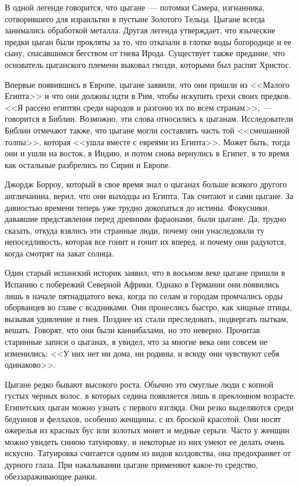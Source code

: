 \documentclass[12pt,a4paper,twoside,openany,svgnames]{memoir}
\begin{document}
В одной легенде говорится, что цыгане~--- потомки Самера, изгнанника, сотворившего для израильтян в пустыне Золотого Тельца. Цыгане всегда занимались обработкой металла. Другая легенда утверждает, что языческие предки цыган были прокляты за то, что отказали в глотке воды богородице и ее сыну, спасавшимся бегством от гнева Ирода. Существует также предание, что основатель цыганского племени выковал гвозди, которыми был распят Христос.

Впервые появившись в Европе, цыгане заявили, что они пришли из <<Малого Египта>> и что они должны идти в Рим, чтобы искупить грехи своих предков. <<Я рассею египтян среди народов и разгоню их по всем странам>>,~--- говорится в Библии. Возможно, эти слова относились к цыганам. Исследователи Библии отмечают также, что цыгане могли составлять часть той <<смешанной толпы>>, которая <<ушла вместе с евреями из Египта>>. Может быть, тогда они и ушли на восток, в Индию, и потом снова вернулись в Египет, в то время как остальные разбрелись по Сирии и Европе.

Джордж Борроу, который в свое время знал о цыганах больше всякого другого англичанина, верил, что они выходцы из Египта. Так считают и сами цыгане. За давностью времени теперь уже трудно докопаться до истины. Фокусники, дававшие представления перед древними фараонами, были цыгане. Да, трудно сказать, откуда взялись эти странные люди, почему они унаследовали ту непоседливость, которая все гонит и гонит их вперед, и почему они радуются, когда смотрят на закат солнца.

Один старый испанский историк заявил, что в восьмом веке цыгане пришли в Испанию с побережий Северной Африки. Однако в Германии они появились лишь в начале пятнадцатого века, когда по селам и городам промчались орды оборванцев во главе с всадниками. Они пронеслись быстро, как хищные птицы, вызывая удивление и гнев. Позднее их стали преследовать, подвергать пыткам, вешать. Говорят, что они были каннибалами, но это неверно. Прочитав старинные записи о цыганах, я увидел, что за многие века они совсем не изменились: <<У них нет ни дома, ни родины, и всюду они чувствуют себя одинаково>>.

Цыгане редко бывают высокого роста. Обычно это смуглые люди с копной густых черных волос, в которых седина появляется лишь в преклонном возрасте. Египетских цыган можно узнать с первого взгляда. Они резко выделяются среди бедуинов и феллахов, особенно женщины, с их броской красотой. Они носят ожерелья из красных бус или золотых монет и медные серьги. Часто у женщин можно увидеть синюю татуировку, и некоторые из них умеют ее делать очень искусно. Татуировка считается одним из видов колдовства, она предохраняет от дурного глаза. При накалывании цыгане применяют какое-то средство, обеззараживающее ранки.
\end{document}

